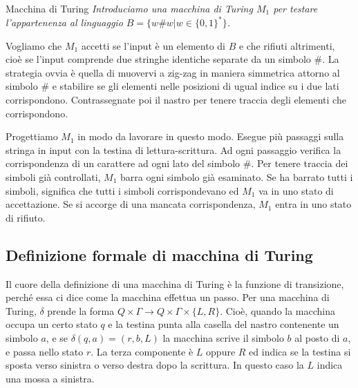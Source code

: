 \begin{Example}{Macchina di Turing}{}
\textit{Introduciamo una macchina di Turing $M_{1}$ per testare l'appartenenza al linguaggio $B=\{ w\#w |w \in\{ 0,1\}^*\}$.}

Vogliamo che $M_{1}$ accetti se l'input è un elemento di $B$ e che rifiuti altrimenti, cioè se l'input comprende due stringhe identiche separate da un simbolo \#. La strategia ovvia è quella di muovervi a zig-zag in maniera simmetrica attorno al simbolo \# e stabilire se gli elementi nelle posizioni di ugual indice su i due lati corrispondono. Contrassegnate poi il nastro per tenere traccia degli elementi che corrispondono. 

Progettiamo $M_{1}$ in modo da lavorare in questo modo. Esegue più passaggi sulla stringa in input con la testina di lettura-scrittura. Ad ogni passaggio verifica la corrispondenza di un carattere ad ogni lato del simbolo \#. Per tenere traccia dei simboli già controllati, $M_{1}$ barra ogni simbolo già esaminato. Se ha barrato tutti i simboli, significa che tutti i simboli corrispondevano ed $M_{1}$ va in uno stato di accettazione. Se si accorge di una mancata corrispondenza, $M_1$ entra in uno stato di rifiuto.
\end{Example}

\subsection{Definizione formale di macchina di Turing}
Il cuore della definizione di una macchina di Turing è la funzione di transizione, perché essa ci dice come la macchina effettua un passo. Per una macchina di Turing, $\delta$ prende la forma $Q\times\Gamma\to Q\times \Gamma\times\{L, R\}$. Cioè, quando la macchina occupa un certo stato $q$ e la testina punta alla casella del nastro contenente un simbolo $a$, e se $\delta(q, a) = (r, b, L)$ la macchina scrive il simbolo $b$ al posto di $a$, e passa nello stato $r$. La terza componente è $L$ oppure $R$ ed indica se la testina si sposta verso sinistra o verso destra dopo la scrittura. In questo caso la $L$ indica una mossa a sinistra.


